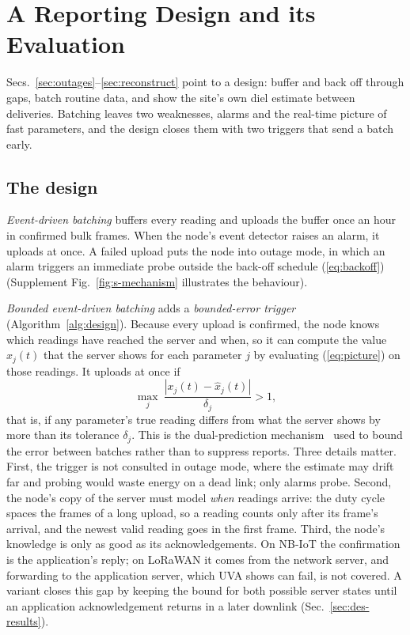 \section{A Reporting Design and its Evaluation}
\label{sec:design}

Secs.~\ref{sec:outages}--\ref{sec:reconstruct} point to a design: buffer and back off through gaps, batch routine data, and show the site's own diel estimate between deliveries. Batching leaves two weaknesses, alarms and the real-time picture of fast parameters, and the design closes them with two triggers that send a batch early.

\subsection{The design}
\label{sec:des-design}
\emph{Event-driven batching} buffers every reading and uploads the buffer once an hour in confirmed bulk frames. When the node's event detector raises an alarm, it uploads at once. A failed upload puts the node into outage mode, in which an alarm triggers an immediate probe outside the back-off schedule (\ref{eq:backoff}) (Supplement Fig.~\ref{fig:s-mechanism} illustrates the behaviour).

\emph{Bounded event-driven batching} adds a \emph{bounded-error trigger} (Algorithm~\ref{alg:design}). Because every upload is confirmed, the node knows which readings have reached the server and when, so it can compute the value $\hat{x}_j(t)$ that the server shows for each parameter $j$ by evaluating (\ref{eq:picture}) on those readings. It uploads at once if
\begin{equation}
\max_{j}\ \frac{|x_j(t)-\hat{x}_j(t)|}{\delta_j}>1,
\label{eq:trigger}
\end{equation}
that is, if any parameter's true reading differs from what the server shows by more than its tolerance $\delta_j$. This is the dual-prediction mechanism~\cite{dias2016survey,santini2006adaptive} used to bound the error between batches rather than to suppress reports. Three details matter. First, the trigger is not consulted in outage mode, where the estimate may drift far and probing would waste energy on a dead link; only alarms probe. Second, the node's copy of the server must model \emph{when} readings arrive: the duty cycle spaces the frames of a long upload, so a reading counts only after its frame's arrival, and the newest valid reading goes in the first frame. Third, the node's knowledge is only as good as its acknowledgements. On NB-IoT the confirmation is the application's reply; on LoRaWAN it comes from the network server, and forwarding to the application server, which UVA shows can fail, is not covered. A variant closes this gap by keeping the bound for both possible server states until an application acknowledgement returns in a later downlink (Sec.~\ref{sec:des-results}).

